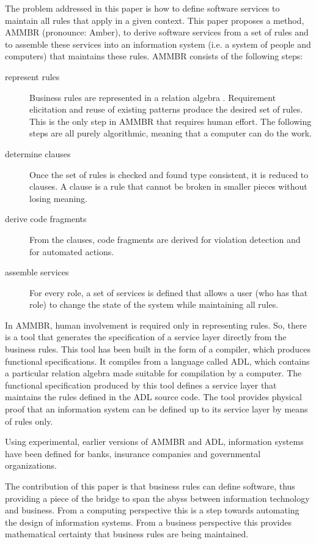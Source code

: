 \documentclass[11pt,a4paper,fleqn,oneside]{article}
\begin{document}
	The problem addressed in this paper is how to define software services to maintain all rules that apply in a given context.
	This paper proposes a method, AMMBR (pronounce: Amber), to derive software services from a set of rules and
	to assemble these services into an information system (i.e. a system of people and computers) that maintains these rules.
	AMMBR consists of the following steps:
\begin{description}
\item[represent rules]
	Business rules are represented in a relation algebra \cite{Maddux2006}.
	Requirement elicitation and reuse of existing patterns produce the desired set of rules.
	This is the only step in AMMBR that requires human effort.
	The following steps are all purely algorithmic, meaning that a computer can do the work.
\item[determine clauses]
	Once the set of rules is checked and found type consistent,
	it is reduced to clauses.
	A clause is a rule that cannot be broken in smaller pieces without losing meaning.
\item[derive code fragments]
	From the clauses, code fragments are derived for violation detection and for automated actions.
\item[assemble services]
	For every role, a set of services is defined that allows a user (who has that role)
	to change the state of the system while maintaining all rules.
\end{description}
	In AMMBR, human involvement is required only in representing rules.
	So, there is a tool that generates the specification of a service layer directly from the business rules.
	This tool has been built in the form of a compiler, which produces functional specifications.
	It compiles from a language called ADL, which contains a particular relation algebra made suitable for compilation by a computer.
	The functional specification produced by this tool defines a service layer
	that maintains the rules defined in the ADL source code.
	The tool provides physical proof that an information system can be defined up to its service layer by means of rules only.

	Using experimental, earlier versions of AMMBR and ADL, information systems have been defined for banks, insurance companies and governmental organizations.

	The contribution of this paper is that business rules can define software,
	thus providing a piece of the bridge to span the abyss between information technology and business.
	From a computing perspective this is a step towards automating the design of information systems.
	From a business perspective this provides mathematical certainty that business rules are being maintained.
\end{document}
